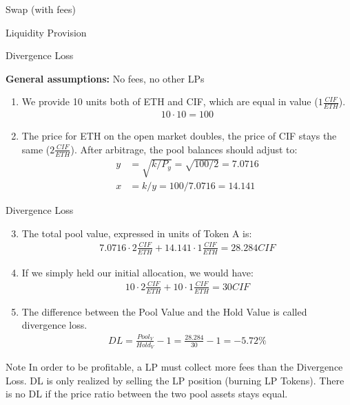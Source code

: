 \documentclass[]{beamer}
\begin{document}
\begin{frame}{Swap (with fees)}
	
\end{frame}


\begin{frame}{Liquidity Provision}
	
\end{frame}


\begin{frame}{Divergence Loss}

	\textbf{General assumptions:} No fees, no other LPs \\ 
		\begin{enumerate}
			\item We provide 10 units both of ETH and CIF, which are equal in value ($1 \tfrac{CIF}{ETH}$).
			\begin{align*}
				10 \cdot 10 = 100	
			\end{align*}
			\item The price for ETH on the open market doubles, the price of CIF stays the same ($2 \tfrac{CIF}{ETH}$). After arbitrage, the pool balances should adjust to:
			\begin{align*}
				y &= \sqrt{k/P_{y}}	 = \sqrt{100/2} = 7.0716 \\
				x &= k / y = 100 / 7.0716 = 14.141
			\end{align*}
		\end{enumerate}	
\end{frame}


\begin{frame}{Divergence Loss}

	\begin{enumerate}
	\setcounter{enumi}{2}
		\item The total pool value, expressed in units of Token A is: 
			\begin{align*}
				7.0716 \cdot 2 \tfrac{CIF}{ETH} + 14.141 \cdot 1 \tfrac{CIF}{ETH} = 28.284 CIF
			\end{align*}
		\item If we simply held our initial allocation, we would have:
			\begin{align*}
			10 \cdot 2 \tfrac{CIF}{ETH} + 10 \cdot 1 \tfrac{CIF}{ETH} = 	30 CIF
			\end{align*}
		\item The difference between the Pool Value and the Hold Value is called divergence loss.
		\begin{align*}
			DL = \tfrac{Pool_V}{Hold_V} -1 = \tfrac{28.284}{30} - 1 = -5.72 \%
			\end{align*}
	\end{enumerate}	
	
	\begin{keytakeaway}{Note}
		In order to be profitable, a LP must collect more fees than the Divergence Loss. DL is only realized by selling the LP position (burning LP Tokens). There is no DL if the price ratio between the two pool assets stays equal.
	\end{keytakeaway}
	
\end{frame}
\end{document}

